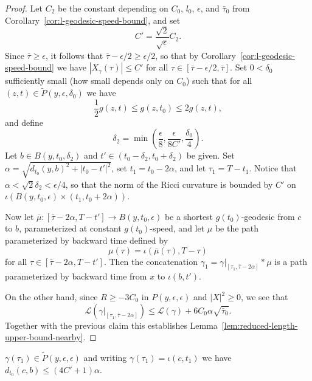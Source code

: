 \begin{proof}
\sketch
{}
Let $C_2$ be the constant depending on $C_0$, $l_0$, $\epsilon$, and
$\bar\tau_0$ from Corollary~\ref{cor:l-geodesic-speed-bound}, and set
$$C'=\frac{\sqrt{2}}{\sqrt{\epsilon}}C_2.$$
Since $\bar\tau\ge \epsilon$, it follows that
$\bar\tau-\epsilon/2\ge \epsilon/2$, so that by
Corollary~\ref{cor:l-geodesic-speed-bound} we have $|X_\gamma(\tau)|\le C'$ for all
$\tau\in [\bar\tau-\epsilon/2,\bar\tau]$. Set $0<\delta_0$
sufficiently small (how small depends only on $C_0$) such that for
all $(z,t)\in \tilde P(y,\epsilon,\delta_0)$ we have
$$\frac{1}{2}g(z,t)\le g(z,t_0)\le 2g(z,t),$$ and define
$$\delta_2=\min\left(\frac{\epsilon}{8},\frac{\epsilon}{8C'},\frac{\delta_0}{4}\right).$$
 Let $b\in B(y,t_0,\delta_2)$ and $t'\in
(t_0-\delta_2,t_0+\delta_2)$ be given. Set
$\alpha=\sqrt{d_{t_0}(y,b)^2+|t_0-t'|^2}$, set $t_1=t_0-2\alpha$,
and let $\tau_1=T-t_1$. Notice that
$\alpha<\sqrt{2}\delta_2<\epsilon/4$, so that the norm of the Ricci
curvature is bounded by $C'$ on
$\iota(B(y,t_0,\epsilon)\times(t_1,t_0+2\alpha))$.



Now let $\overline\mu\colon [\bar\tau-2\alpha,T-t']\to
B(y,t_0,\epsilon)$ be a shortest $g(t_0)$-geodesic from $c$ to $b$,
parameterized at constant $g(t_0)$-speed, and let $\mu$ be the path
parameterized by backward time defined by
$$\mu(\tau)=\iota(\overline\mu(\tau),T-\tau)$$
for all $\tau\in [\bar\tau-2\alpha,T-t']$. Then the concatenation
$\gamma_1=\gamma|_{[\tau_1,\bar\tau-2\alpha]}*\mu$ is a path
parameterized by backward time from $x$ to $\iota(b,t')$.





On the other hand, since $R\ge -3C_0$ in $P(y,\epsilon,\epsilon)$
and $|X|^2\ge 0$, we see that
$${\mathcal L}(\gamma|_{[\tau_1,\bar\tau-2\alpha]})\le {\mathcal L}(\gamma)
+ 6C_0\alpha\sqrt{\bar\tau_0}.$$  Together with the previous claim
this establishes Lemma~\ref{lem:reduced-length-upper-bound-nearby}.
\end{proof}

\begin{claim}\label{claim:l-geodesic-endpoint-close-to-ball}
\label{6.66}
$\gamma(\tau_1)\in \widetilde P(y,\epsilon,\epsilon)$ and writing
$\gamma(\tau_1)=\iota(c,t_1)$ we have $d_{t_0}(c,b)\le
(4C'+1)\alpha$.
\end{claim}

